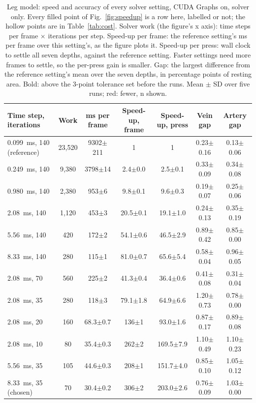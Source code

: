 \begin{table}[t]
\centering
\caption{Leg model: speed and accuracy of every solver setting, CUDA Graphs on, solver only. Every filled point of
Fig.~\ref{fig:speedup} is a row here, labelled or not; the hollow points are in Table~\ref{tab:cost}. Solver work
(the figure's x axis): time steps per frame $\times$ iterations per step. Speed-up per frame: the reference setting's
ms per frame over this setting's, as the figure plots it. Speed-up per press: wall clock to settle all seven depths, against
the reference setting. Faster settings need more frames to settle, so the per-press gain is smaller. Gap: the largest
difference from the reference setting's mean over the seven depths, in percentage points of resting area. Bold: above the 3-point
tolerance set before the runs. Mean $\pm$ SD over five runs; red: fewer, n shown.}
\label{tab:speed}
\footnotesize
\setlength{\tabcolsep}{6pt}
\begin{tabular}{lcccccc}
\hline
\textbf{Time step, iterations} & \textbf{Work} & \textbf{ms per frame} & \textbf{Speed-up, frame} & \textbf{Speed-up, press} & \textbf{Vein gap} & \textbf{Artery gap} \\
\hline
0.099~ms, 140 (reference) & 23,520 & 9302$\pm$211 & 1 & 1 & 0.23$\pm$0.16 & 0.13$\pm$0.06 \\
0.249~ms, 140 & 9,380 & 3798$\pm$14 & 2.4$\pm$0.0 & 2.5$\pm$0.1 & 0.33$\pm$0.09 & 0.34$\pm$0.08 \\
0.980~ms, 140 & 2,380 & 953$\pm$6 & 9.8$\pm$0.1 & 9.6$\pm$0.3 & 0.19$\pm$0.07 & 0.25$\pm$0.06 \\
2.08~ms, 140 & 1,120 & 453$\pm$3 & 20.5$\pm$0.1 & 19.1$\pm$1.0 & 0.24$\pm$0.13 & 0.35$\pm$0.19 \\
5.56~ms, 140 & 420 & 172$\pm$2 & 54.1$\pm$0.6 & 46.5$\pm$2.9 & 0.89$\pm$0.42 & 0.85$\pm$0.00 \\
8.33~ms, 140 & 280 & 115$\pm$1 & 81.0$\pm$0.7 & 65.6$\pm$5.4 & 0.58$\pm$0.04 & 0.96$\pm$0.05 \\
2.08~ms, 70 & 560 & 225$\pm$2 & 41.3$\pm$0.4 & 36.4$\pm$0.6 & 0.41$\pm$0.08 & 0.31$\pm$0.04 \\
2.08~ms, 35 & 280 & 118$\pm$3 & 79.1$\pm$1.8 & 64.9$\pm$6.6 & 1.20$\pm$0.73 & 0.78$\pm$0.00 \\
2.08~ms, 20 & 160 & 68.3$\pm$0.7 & 136$\pm$1 & 93.0$\pm$1.6 & 0.87$\pm$0.17 & 0.89$\pm$0.08 \\
2.08~ms, 10 & 80 & 35.4$\pm$0.3 & 262$\pm$2 & 169.5$\pm$7.9 & 1.10$\pm$0.49 & 1.10$\pm$0.23 \\
5.56~ms, 35 & 105 & 44.6$\pm$0.3 & 208$\pm$1 & 151.7$\pm$4.0 & 0.85$\pm$0.10 & 1.05$\pm$0.12 \\
8.33~ms, 35 (chosen) & 70 & 30.4$\pm$0.2 & 306$\pm$2 & 203.0$\pm$2.6 & 0.76$\pm$0.09 & 1.03$\pm$0.00 \\
\hline
\end{tabular}
\end{table}
